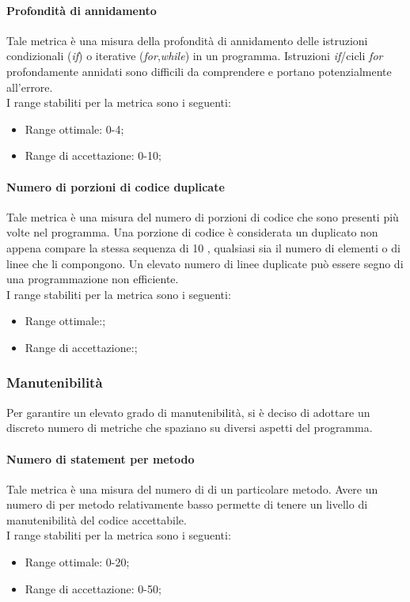 			\paragraph{Profondità di annidamento}
			Tale metrica è una misura della profondità di annidamento delle istruzioni condizionali (\textit{if}) o iterative (\textit{for},\textit{while}) in un programma. Istruzioni \textit{if}/cicli \textit{for} profondamente annidati sono difficili da comprendere e portano potenzialmente all'errore.
			\\I range stabiliti per la metrica sono i seguenti:
			\begin{itemize}
				\item Range ottimale: 0-4;
				\item Range di accettazione: 0-10;
			\end{itemize}
			
			\paragraph{Numero di porzioni di codice duplicate}
			Tale metrica è una misura del numero di porzioni di codice che sono presenti più volte nel programma. Una porzione di codice è considerata un duplicato non appena compare la stessa sequenza di 10 , qualsiasi sia il numero di elementi o di linee che li compongono. Un elevato numero di linee duplicate può essere segno di una programmazione non efficiente.
			\\I range stabiliti per la metrica sono i seguenti:
			\begin{itemize}
				\item Range ottimale:;
				\item Range di accettazione:;
			\end{itemize}
		\subsubsection{Manutenibilità \label{S4}}
		Per garantire un elevato grado di manutenibilità, si è deciso di adottare un discreto numero di metriche che spaziano su diversi aspetti del programma.
			\paragraph{Numero di statement per metodo}
			Tale metrica è una misura del numero di  di un particolare metodo. Avere un numero di  per metodo relativamente basso permette di tenere un livello di manutenibilità del codice accettabile.
			\\I range stabiliti per la metrica sono i seguenti:
			\begin{itemize}
				\item Range ottimale: 0-20;
				\item Range di accettazione: 0-50;
			\end{itemize}
			
